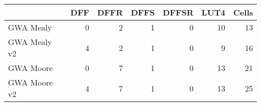 % 
% 
\begin{tabular}{l|*{5}{r}|r}
  & DFF & DFFR & DFFS & DFFSR & LUT4 & Cells\\
\hline
GWA Mealy  & 0 & 2 & 1 & 0 & 10 & 13 \\
GWA Mealy v2  & 4 & 2 & 1 & 0 & 9 & 16 \\
GWA Moore  & 0 & 7 & 1 & 0 & 13 & 21 \\
GWA Moore v2  & 4 & 7 & 1 & 0 & 13 & 25 \\
\end{tabular}
